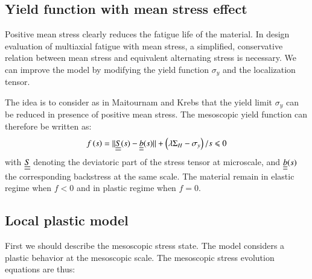 \documentclass[3p,times,number,review]{elsarticle}
\begin{document}
\subsection{Yield function with mean stress effect}

Positive mean stress clearly reduces the fatigue life of the material. In design evaluation of multiaxial fatigue with mean stress, a simplified, conservative relation between mean stress and equivalent alternating stress is necessary. We can improve the model by modifying the yield function $\sigma_y$ and the localization tensor.

The idea is to consider as in Maitournam and Krebs\cite{Maitournam2011232} that the yield limit $\sigma_y$ can be reduced in presence of positive mean stress. The mesoscopic yield function can therefore be written as:
\begin{equation}
f\left(s\right)=||\uline{\uline{S}}(s)-\uline{\uline{b}}(s)||+\left( \lambda \Sigma_H-\sigma_y\right) /s\leqslant 0
\label{yieldfun}
\end{equation}
with $\uline{\uline{S}}$ denoting the deviatoric part of the stress tensor at microscale, and $\uline{\uline{b}}(s)$ the corresponding backstress at the same scale. The material remain in elastic regime when $f<0$ and in plastic regime when $f=0$.

\subsection{Local plastic model}
First we should describe the mesoscopic stress state.  The model considers a plastic 
behavior at the mesoscopic scale. The mesoscopic stress evolution equations are thus:

 
\end{document}
